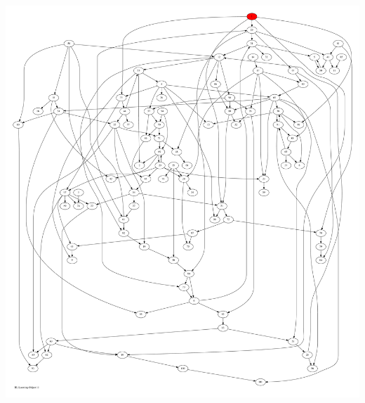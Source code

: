 \documentclass{article}
\begin{document}
\newpage
\includegraphics[max height=\textheight,max width=\textwidth]{bl_looming_objs/bl_loom_obj11_pp.pdf}
\end{document}
